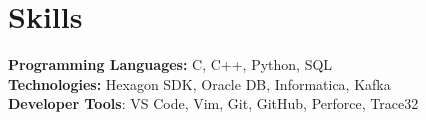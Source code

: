 \documentclass[letterpaper,8pt]{article}
\makeatletter
\newcommand{\resumeOrganizationHeading}[4]{
  \vspace{-2pt}\item
    \begin{tabular*}{0.97\textwidth}[t]{l@{\extracolsep{\fill}}r}
      \textbf{#1} & \textit{\small #2} \\
      \textit{\small#3}
    \end{tabular*}\vspace{-7pt}
}
\newcommand{\resumeSubHeadingListStart}{\begin{itemize}[leftmargin=0.15in, label={}]}
\newcommand{\resumeSubHeadingListEnd}{\end{itemize}}
\makeatother
\begin{document}

\section{Skills}
  \vspace{2pt}
  \resumeSubHeadingListStart
    \small{\item{
        \textbf{Programming Languages:} C, C++, Python, SQL \\
        \textbf{Technologies:}{ Hexagon SDK, Oracle DB, Informatica, Kafka} \\
        \textbf{Developer Tools}{: VS Code, Vim, Git, GitHub, Perforce, Trace32}
    }}
  \resumeSubHeadingListEnd




        




    
    
\end{document}
